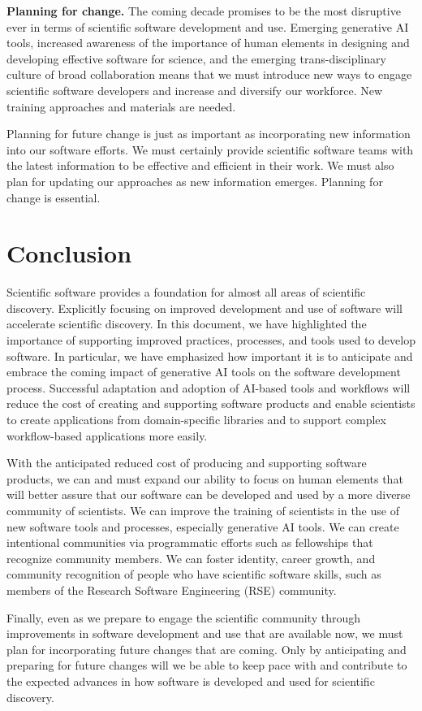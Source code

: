 {\bf Planning for change.}
The coming decade promises to be the most disruptive ever in terms of scientific software development and use.  Emerging generative AI tools, increased awareness of the importance of human elements in designing and developing effective software for science, and the emerging trans-disciplinary culture of broad collaboration means that we must introduce new ways to engage scientific software developers and increase and diversify our workforce.  New training approaches and materials are needed.  

Planning for future change is just as important as incorporating new information into our software efforts.   We must certainly provide scientific software teams with the latest information to be effective and efficient in their work.  We must also plan for updating our approaches as new information emerges.  Planning for change is essential.

\section*{Conclusion}
Scientific software provides a foundation for almost all areas of scientific discovery.  Explicitly focusing on improved development and use of software will accelerate scientific discovery.  In this document, we have highlighted the importance of supporting improved practices, processes, and tools used to develop software.  In particular, we have emphasized how important it is to anticipate and embrace the coming impact of generative AI tools on the software development process.  Successful adaptation and adoption of AI-based tools and workflows will reduce the cost of creating and supporting software products and enable scientists to create applications from domain-specific libraries and to support complex workflow-based applications more easily.

With the anticipated reduced cost of producing and supporting software products, we can and must expand our ability to focus on human elements that will better assure that our software can be developed and used by a more diverse community of scientists.  We can improve the training of scientists in the use of new software tools and processes, especially generative AI tools.  We can create intentional communities via programmatic efforts such as fellowships that recognize community members.  We can foster identity, career growth, and community recognition of people who have scientific software skills, such as members of the Research Software Engineering (RSE) community.

Finally, even as we prepare to engage the scientific community through improvements in software development and use that are available now, we must plan for incorporating future changes that are coming.  Only by anticipating and preparing for future changes will we be able to keep pace with and contribute to the expected advances in how software is developed and used for scientific discovery.
    